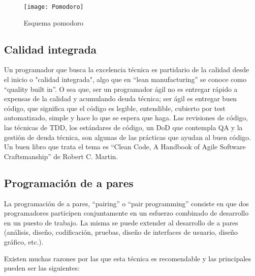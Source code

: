 \begin{figure}[h]
  \centering
  \texttt{[image: Pomodoro]}
  \caption{Esquema pomodoro}
  \centering
  \label{fig:Pomodoro} %
\end{figure}
\FloatBarrier %

\subsection{Calidad integrada}

Un programador que busca la excelencia técnica es partidario de la calidad desde el inicio o "calidad integrada", algo que en “lean manufacturing” se conoce como “quality built in”. O sea que, ser un programador ágil no es entregar rápido a expensas de la calidad y acumulando deuda técnica; ser ágil es entregar buen código, que significa que el código es legible, entendible, cubierto por test automatizado, simple y hace lo que se espera que haga. Las revisiones de código, las técnicas de TDD, los estándares de código, un DoD que contempla QA y la gestión de deuda técnica, son algunas de las prácticas que ayudan al buen código. Un buen libro que trata el tema es “Clean Code, A Handbook of Agile Software Craftsmanship” de Robert C. Martin.

\subsection{Programación de a pares}

La programación de a pares, “pairing” o “pair programming” consiste en que dos programadores participen conjuntamente en un esfuerzo combinado de desarrollo en un puesto de trabajo. La misma se puede extender al desarrollo de a pares (análisis, diseño, codificación, pruebas, diseño de interfaces de usuario, diseño gráfico, etc.).

Existen muchas razones por las que esta técnica es recomendable y las principales pueden ser las siguientes:

